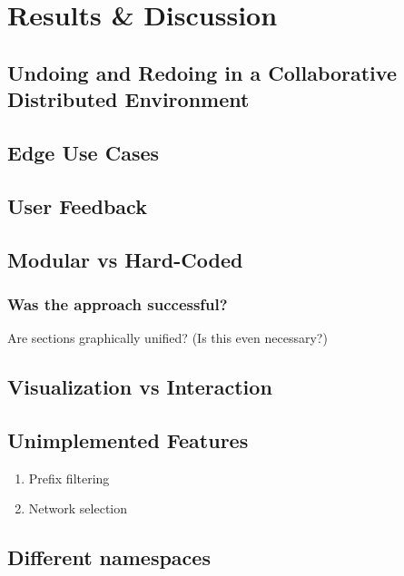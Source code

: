 \chapter{Results \& Discussion}

\section{Undoing and Redoing in a Collaborative Distributed Environment}

\section{Edge Use Cases}

\section{User Feedback}

\section{Modular vs Hard-Coded}
\subsection{Was the approach successful?}
Are sections graphically unified? (Is this even necessary?)
	
\section{Visualization vs Interaction}

\section{Unimplemented Features}
	\begin{enumerate}
		\item Prefix filtering
		\item Network selection
	\end{enumerate}

\section{Different namespaces}

